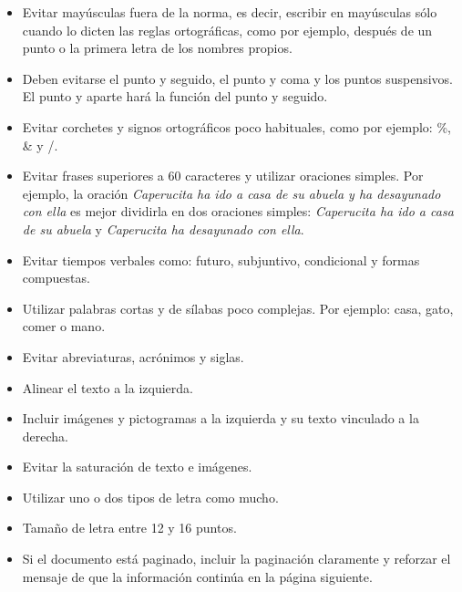\begin{itemize}
	\item Evitar mayúsculas fuera de la norma, es decir, escribir en mayúsculas sólo cuando lo dicten las reglas ortográficas, como por ejemplo, después de un punto o la primera letra de los nombres propios.
	\item Deben evitarse el punto y seguido, el punto y coma y los puntos suspensivos. El punto y aparte hará la función del punto y seguido.
	\item Evitar corchetes y signos ortográficos poco habituales, como por ejemplo: \%, \& y /.
	\item Evitar frases superiores a 60 caracteres y utilizar oraciones simples. Por ejemplo, la oración \textit{Caperucita ha ido a casa de su abuela y ha desayunado con ella} es mejor dividirla en dos oraciones simples:\textit{ Caperucita ha ido a casa de su abuela} y  \textit{Caperucita ha desayunado con ella}.
	\item Evitar tiempos verbales como: futuro, subjuntivo, condicional y formas compuestas.
	\item Utilizar palabras cortas y de sílabas poco complejas. 
	Por ejemplo: casa, gato, comer o mano.
	\item Evitar abreviaturas, acrónimos y siglas.
	\item Alinear el texto a la izquierda.
	\item Incluir imágenes y pictogramas a la izquierda y su texto vinculado a la derecha.
	\item Evitar la saturación de texto e imágenes.
	\item Utilizar uno o dos tipos de letra como mucho.
	\item Tamaño de letra entre 12 y 16 puntos.
	\item Si el documento está paginado, incluir la paginación claramente y reforzar el mensaje de que la información continúa en la página siguiente.
\end{itemize}


